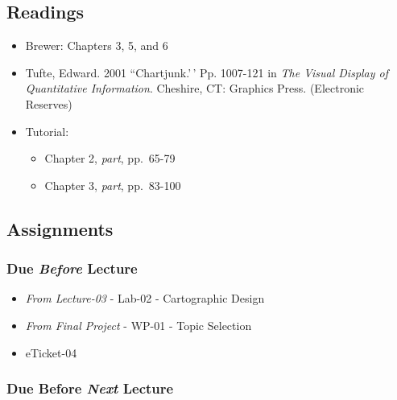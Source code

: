 \documentclass[
]{book}
\providecommand{\tightlist}{%
  \setlength{\itemsep}{0pt}\setlength{\parskip}{0pt}}
\begin{document}
\hypertarget{readings-5}{%
\subsection*{Readings}\label{readings-5}}

\begin{itemize}
\tightlist
\item
  Brewer: Chapters 3, 5, and 6
\item
  Tufte, Edward. 2001 ``Chartjunk.'\,' Pp. 1007-121 in \emph{The Visual Display of Quantitative Information}. Cheshire, CT: Graphics Press. (Electronic Reserves)
\item
  Tutorial:

  \begin{itemize}
  \tightlist
  \item
    Chapter 2, \emph{part}, pp.~65-79
  \item
    Chapter 3, \emph{part}, pp.~83-100
  \end{itemize}
\end{itemize}

\hypertarget{assignments-5}{%
\subsection*{Assignments}\label{assignments-5}}

\hypertarget{due-before-lecture-3}{%
\subsubsection*{\texorpdfstring{Due \emph{Before} Lecture}{Due Before Lecture}}\label{due-before-lecture-3}}

\begin{itemize}
\tightlist
\item
  \emph{From Lecture-03} - Lab-02 - Cartographic Design
\item
  \emph{From Final Project} - WP-01 - Topic Selection
\item
  eTicket-04
\end{itemize}

\hypertarget{due-before-next-lecture-2}{%
\subsubsection*{\texorpdfstring{Due Before \emph{Next} Lecture}{Due Before Next Lecture}}\label{due-before-next-lecture-2}}
\end{document}
